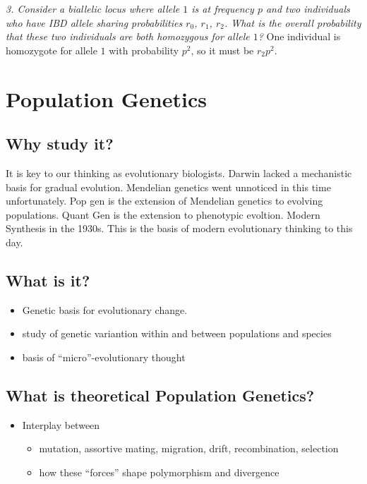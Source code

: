 \documentclass{article}
\begin{document}
        \emph{3. Consider a biallelic locus where allele $1$ is at frequency $p$ and two individuals who have IBD allele sharing probabilities $r_0$, $r_1$, $r_2$.  What is the overall probability that these two individuals are both homozygous for allele $1$?}  {\color{magenta}One individual is homozygote for allele $1$ with probability $p^2$, so it must be $r_2p^2$.}

    \section{Population Genetics}
        \subsection{Why study it?}
            It is key to our thinking as evolutionary biologists.  Darwin lacked a mechanistic basis for gradual evolution.  Mendelian genetics went unnoticed in this time unfortunately.  Pop gen is the extension of Mendelian genetics to evolving populations.  Quant Gen is the extension to phenotypic evoltion.  Modern Synthesis in the 1930s.  This is the basis of modern evolutionary thinking to this day.

        \subsection{What is it?}
            \begin{itemize}
                \item Genetic basis for evolutionary change.
                \item study of genetic variantion within and between populations and species
                \item basis of ``micro''-evolutionary thought
            \end{itemize}

        \subsection{What is theoretical Population Genetics?}
            \begin{itemize}
                \item Interplay between
                \begin{itemize}
                    \item mutation, assortive mating, migration, drift, recombination, selection
                    \item how these ``forces'' shape polymorphism and divergence
                \end{itemize}
            \end{itemize}
\end{document}
